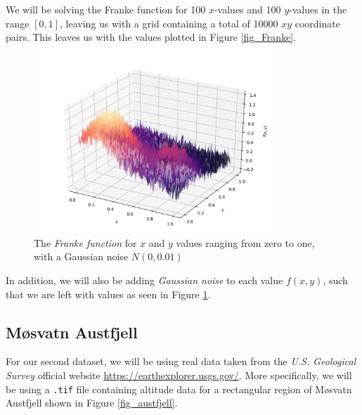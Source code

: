 \documentclass[a4paper,10pt,english]{article}
\begin{document}
	We will be solving the Franke function for 100 $x$-values and 100 $y$-values in the range $[0,1]$, leaving us with a grid containing a total of 10000 $xy$ coordinate pairs.  This leaves us with the values plotted in Figure \ref{fig_Franke}.
	
	\begin{figure}[H]
		\centering
		\includegraphics[width = 0.8\textwidth, center]{Franke_noise.png}
		\caption{The \textit{Franke function} for $x$ and $y$ values ranging from zero to one, with a Gaussian noise $N(0,0.01)$\label{fig_Franke_noise}}
	\end{figure}
	
	In addition, we will also be adding \textit{Gaussian noise} to each value $f(x,y)$, such that we are left with values as seen in Figure \ref{fig_Franke_noise}.
	
	\subsection*{Møsvatn Austfjell}
	
	For our second dataset, we will be using real data taken from the \textit{U.S. Geological Survey} \cite{earthexplorer} official website \url{https://earthexplorer.usgs.gov/}.  More specifically, we will be using a \texttt{.tif} file containing altitude data for a rectangular region of Møsvatn Austfjell shown in Figure \ref{fig_austfjell}.
	
\end{document}
